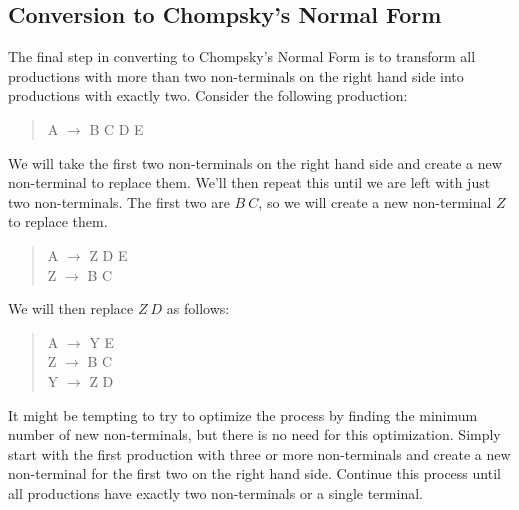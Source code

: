 \documentclass[letterpaper,12pt,openany,reqno]{book}%
\begin{document}
\subsection{Conversion to Chompsky's Normal Form}
The final step in converting to Chompsky's Normal Form is to transform all productions with more than two non-terminals on the right hand side into productions with exactly two. Consider the following production:
\begin{quote}
{\ttfamily A} $\rightarrow$ {\ttfamily B C D E}\\
\end{quote}
We will take the first two non-terminals on the right hand side and create a new non-terminal to replace them. We'll then repeat this until we are left with just two non-terminals. The first two are $B\ C$, so we will create a new non-terminal $Z$ to replace them.
\begin{quote}
{\ttfamily A} $\rightarrow$ {\ttfamily Z D E}\\
{\ttfamily Z} $\rightarrow$ {\ttfamily B C}\\
\end{quote}
We will then replace $Z\ D$ as follows:
\begin{quote}
{\ttfamily A} $\rightarrow$ {\ttfamily Y E}\\
{\ttfamily Z} $\rightarrow$ {\ttfamily B C}\\
{\ttfamily Y} $\rightarrow$ {\ttfamily Z D}\\
\end{quote}

It might be tempting to try to optimize the process by finding the minimum number of new non-terminals, but there is no need for this optimization. Simply start with the first production with three or more non-terminals and create a new non-terminal for the first two on the right hand side. Continue this process until all productions have exactly two non-terminals or a single terminal.
\end{document}
